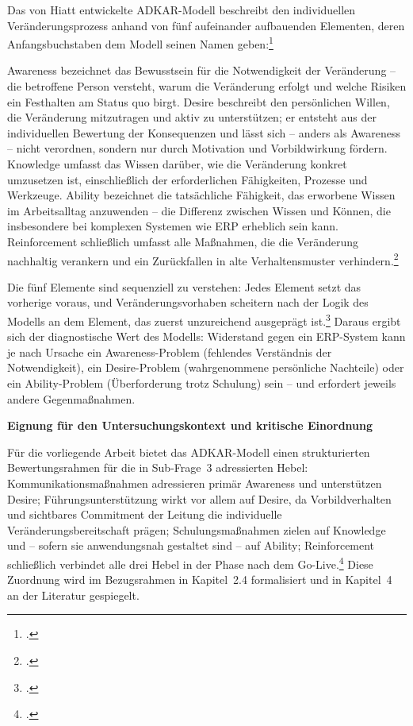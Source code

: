 Das von Hiatt entwickelte ADKAR-Modell beschreibt den individuellen Ver\"anderungsprozess anhand von f\"unf aufeinander aufbauenden Elementen, deren Anfangsbuchstaben dem Modell seinen Namen geben:\footcite[Vgl.][S.~1--3]{hiatt2006}

Awareness bezeichnet das Bewusstsein f\"ur die Notwendigkeit der Ver\"anderung -- die betroffene Person versteht, warum die Ver\"anderung erfolgt und welche Risiken ein Festhalten am Status quo birgt. Desire beschreibt den pers\"onlichen Willen, die Ver\"anderung mitzutragen und aktiv zu unterst\"utzen; er entsteht aus der individuellen Bewertung der Konsequenzen und l\"asst sich -- anders als Awareness -- nicht verordnen, sondern nur durch Motivation und Vorbildwirkung f\"ordern. Knowledge umfasst das Wissen dar\"uber, wie die Ver\"anderung konkret umzusetzen ist, einschlie\ss{}lich der erforderlichen F\"ahigkeiten, Prozesse und Werkzeuge. Ability bezeichnet die tats\"achliche F\"ahigkeit, das erworbene Wissen im Arbeitsalltag anzuwenden -- die Differenz zwischen Wissen und K\"onnen, die insbesondere bei komplexen Systemen wie ERP erheblich sein kann. Reinforcement schlie\ss{}lich umfasst alle Ma\ss{}nahmen, die die Ver\"anderung nachhaltig verankern und ein Zur\"uckfallen in alte Verhaltensmuster verhindern.\footcite[Vgl.][S.~43~ff.]{hiatt2006}

Die f\"unf Elemente sind sequenziell zu verstehen: Jedes Element setzt das vorherige voraus, und Ver\"anderungsvorhaben scheitern nach der Logik des Modells an dem Element, das zuerst unzureichend ausgepr\"agt ist.\footcite[Vgl.][S.~2--4]{hiatt2006} Daraus ergibt sich der diagnostische Wert des Modells: Widerstand gegen ein ERP-System kann je nach Ursache ein Awareness-Problem (fehlendes Verst\"andnis der Notwendigkeit), ein Desire-Problem (wahrgenommene pers\"onliche Nachteile) oder ein Ability-Problem (\"Uberforderung trotz Schulung) sein -- und erfordert jeweils andere Gegenma\ss{}nahmen.

\textbf{Eignung f\"ur den Untersuchungskontext und kritische Einordnung}

F\"ur die vorliegende Arbeit bietet das ADKAR-Modell einen strukturierten Bewertungsrahmen f\"ur die in Sub-Frage~3 adressierten Hebel: Kommunikationsma\ss{}nahmen adressieren prim\"ar Awareness und unterst\"utzen Desire; F\"uhrungsunterst\"utzung wirkt vor allem auf Desire, da Vorbildverhalten und sichtbares Commitment der Leitung die individuelle Ver\"anderungsbereitschaft pr\"agen; Schulungsma\ss{}nahmen zielen auf Knowledge und -- sofern sie anwendungsnah gestaltet sind -- auf Ability; Reinforcement schlie\ss{}lich verbindet alle drei Hebel in der Phase nach dem Go-Live.\footcite[Vgl.][S.~126--128]{galli2018} Diese Zuordnung wird im Bezugsrahmen in Kapitel~2.4 formalisiert und in Kapitel~4 an der Literatur gespiegelt.

